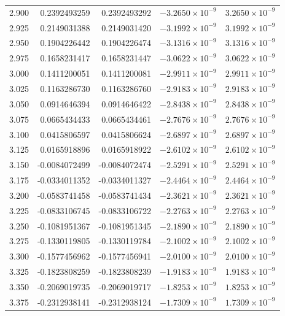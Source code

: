 \documentclass[11pt,a4paper]{article}
\begin{document}
\begin{longtable}{rrrrr}
2.900 & 0.2392493259 & 0.2392493292 & $-3.2650\times 10^{-9}$ & $3.2650\times 10^{-9}$ \\
2.925 & 0.2149031388 & 0.2149031420 & $-3.1992\times 10^{-9}$ & $3.1992\times 10^{-9}$ \\
2.950 & 0.1904226442 & 0.1904226474 & $-3.1316\times 10^{-9}$ & $3.1316\times 10^{-9}$ \\
2.975 & 0.1658231417 & 0.1658231447 & $-3.0622\times 10^{-9}$ & $3.0622\times 10^{-9}$ \\
3.000 & 0.1411200051 & 0.1411200081 & $-2.9911\times 10^{-9}$ & $2.9911\times 10^{-9}$ \\
3.025 & 0.1163286730 & 0.1163286760 & $-2.9183\times 10^{-9}$ & $2.9183\times 10^{-9}$ \\
3.050 & 0.0914646394 & 0.0914646422 & $-2.8438\times 10^{-9}$ & $2.8438\times 10^{-9}$ \\
3.075 & 0.0665434433 & 0.0665434461 & $-2.7676\times 10^{-9}$ & $2.7676\times 10^{-9}$ \\
3.100 & 0.0415806597 & 0.0415806624 & $-2.6897\times 10^{-9}$ & $2.6897\times 10^{-9}$ \\
3.125 & 0.0165918896 & 0.0165918922 & $-2.6102\times 10^{-9}$ & $2.6102\times 10^{-9}$ \\
3.150 & -0.0084072499 & -0.0084072474 & $-2.5291\times 10^{-9}$ & $2.5291\times 10^{-9}$ \\
3.175 & -0.0334011352 & -0.0334011327 & $-2.4464\times 10^{-9}$ & $2.4464\times 10^{-9}$ \\
3.200 & -0.0583741458 & -0.0583741434 & $-2.3621\times 10^{-9}$ & $2.3621\times 10^{-9}$ \\
3.225 & -0.0833106745 & -0.0833106722 & $-2.2763\times 10^{-9}$ & $2.2763\times 10^{-9}$ \\
3.250 & -0.1081951367 & -0.1081951345 & $-2.1890\times 10^{-9}$ & $2.1890\times 10^{-9}$ \\
3.275 & -0.1330119805 & -0.1330119784 & $-2.1002\times 10^{-9}$ & $2.1002\times 10^{-9}$ \\
3.300 & -0.1577456962 & -0.1577456941 & $-2.0100\times 10^{-9}$ & $2.0100\times 10^{-9}$ \\
3.325 & -0.1823808259 & -0.1823808239 & $-1.9183\times 10^{-9}$ & $1.9183\times 10^{-9}$ \\
3.350 & -0.2069019735 & -0.2069019717 & $-1.8253\times 10^{-9}$ & $1.8253\times 10^{-9}$ \\
3.375 & -0.2312938141 & -0.2312938124 & $-1.7309\times 10^{-9}$ & $1.7309\times 10^{-9}$ \\

\end{longtable}
\end{document}
